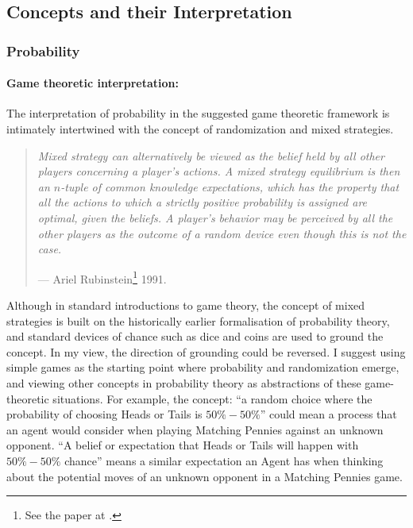 \documentclass{article}
\begin{document}
\subsection*{Concepts and their Interpretation}

\subsubsection*{Probability}

\paragraph{Game theoretic interpretation:}
The interpretation of probability in the suggested game theoretic framework is intimately intertwined with the concept of randomization and mixed strategies.

    \begin{quote}
    {\it
    Mixed strategy can alternatively be viewed as the belief held by all other players concerning a player's actions. A mixed strategy equilibrium is then an $n$-tuple of common knowledge expectations, which has the property that all the actions to which a strictly positive probability is assigned are optimal, given the beliefs. A player's behavior may be perceived by all the other players as the outcome of a random device even though this is not the case.
    }
    
    \hfill --- Ariel Rubinstein\footnote{See the paper at \cite{paper:Rubinstein1991}.} 1991.
    \end{quote}

Although in standard introductions to game theory, the concept of mixed strategies is built on the historically earlier formalisation of probability theory, and standard devices of chance such as dice and coins are used to ground the concept. In my view, the direction of grounding could be reversed.
I suggest using simple games as the starting point where probability and randomization emerge, and viewing other concepts in probability theory as abstractions of these game-theoretic situations.
For example, the concept: ``a random choice where the probability of choosing Heads or Tails is $50\%-50\%$'' could mean a process that an agent would consider when playing Matching Pennies against an unknown opponent. ``A belief or expectation that Heads or Tails will happen with $50\%-50\%$ chance'' means a similar expectation an Agent has when thinking about the potential moves of an unknown opponent in a Matching Pennies game.
\end{document}
